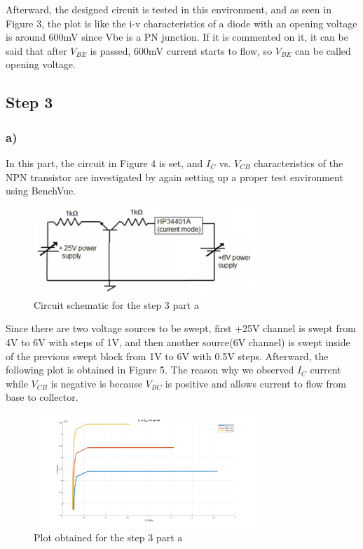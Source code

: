 \documentclass[letterpaper,12pt]{article}
\begin{document}
Afterward, the designed circuit is tested in this environment, and as seen in Figure 3, the plot is like the i-v characteristics of a diode with an opening voltage is around 600mV since Vbe is a PN junction. If it is commented on it, it can be said that after \( V_{BE}\) is passed, 600mV current starts to flow, so \( V_{BE}\) can be called opening voltage.    

\subsection{Step 3}

\subsubsection{a)} 
In this part, the circuit in Figure 4 is set, and \(I_C\) vs. \(V_{CB}\) characteristics of the NPN transistor are investigated by again setting up a proper test environment using BenchVue. 
\begin{figure}[H]
    \centering
    \includegraphics[width = 0.75\textwidth]{step3.png}
    \caption{Circuit schematic for the step 3 part a}
\end{figure} 

Since there are two voltage sources to be swept, first +25V channel is swept from 4V to 6V with steps of 1V, and then another source(6V channel) is swept inside of the previous swept block from 1V to 6V with 0.5V steps.  
Afterward, the following plot is obtained in Figure 5. The reason why we observed \(I_C\) current while \(V_{CB}\) is negative is because \(V_{BC}\) is positive and allows current to flow from base to collector.

\begin{figure}[H]
    \centering
    \includegraphics[width = 0.75\textwidth]{3_1.png}
    \caption{Plot obtained for the step 3 part a}
    \end{figure} 
\end{document}
